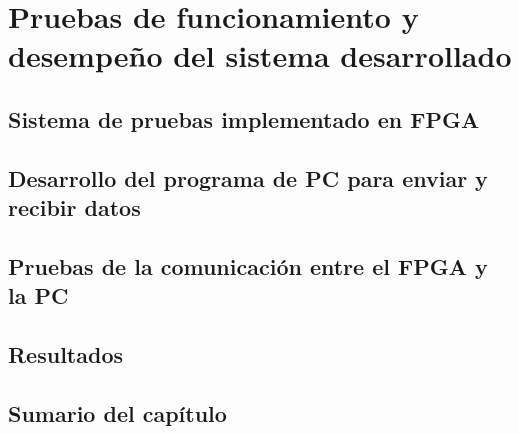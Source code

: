 \chapter{Pruebas de funcionamiento y desempeño del sistema desarrollado}
	\label{cap:verif}
	
%		
	\section{Sistema de pruebas implementado en FPGA}
		
	\section{Desarrollo del programa de PC para enviar y recibir datos}
			
	\section{Pruebas de la comunicación entre el FPGA y la PC}
		
	\section{Resultados}
		
	\section{Sumario del capítulo}
		
